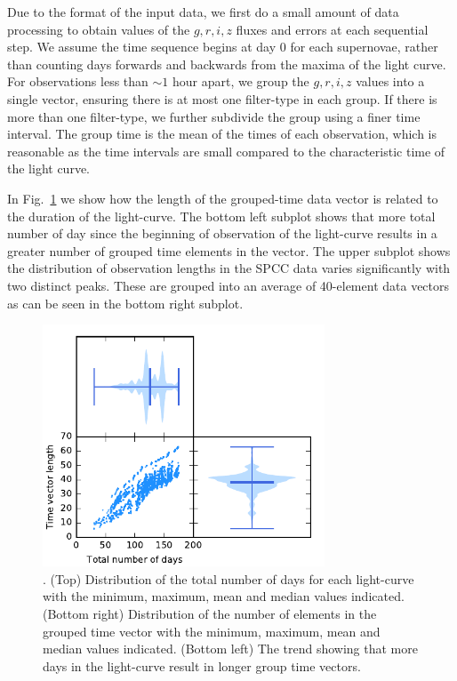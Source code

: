 \documentclass[twocolumn]{aastex61}
\begin{document}
Due to the format of the input data, we first do a small amount of data processing to obtain values of the $g,r,i,z$ fluxes and errors at each sequential step.  We assume the time sequence begins at day 0 for each supernovae, rather than counting days forwards and backwards from the maxima of the light curve. For observations less than $\sim1$ hour apart, we group the $g,r,i,z$ values into a single vector, ensuring there is at most one filter-type in each group. If there is more than one filter-type, we further subdivide the group using a finer time interval.  The group time is the mean of the times of each observation, which is reasonable as the time intervals are small compared to the characteristic time of the light curve. 

In Fig.~\ref{fig:violinplot} we show how the length of the grouped-time data vector is related to the duration of the light-curve. The bottom left subplot shows that more total number of day since the beginning of observation of the light-curve results in a greater number of grouped time elements in the vector. The upper subplot shows the distribution of observation lengths in the SPCC data varies significantly with two distinct peaks. These are grouped into an average of 40-element data vectors as can be seen in the bottom right subplot.

\begin{figure}
\centering
\includegraphics[width=84mm, angle=0]{f2.pdf}
\caption{\label{fig:violinplot}. (Top) Distribution of the total number of days for each light-curve with the minimum, maximum, mean and median values indicated. (Bottom right) Distribution of the number of elements in the grouped time vector with the minimum, maximum, mean and median values indicated. (Bottom left) The trend showing that more days in the light-curve result in longer group time vectors.
 }
\end{figure}
\end{document}
